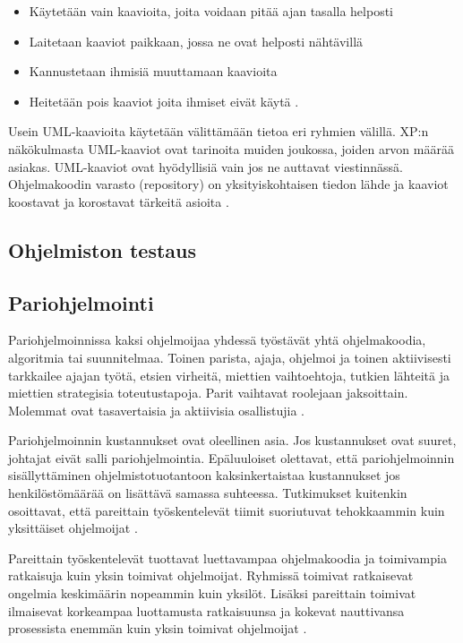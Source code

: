 \documentclass[finnish]{tktltiki2}
\theoremstyle{definition}
\theoremstyle{remark}
\begin{document}
\begin{itemize}
 \item Käytetään vain kaavioita, joita voidaan pitää ajan tasalla helposti 
 \item Laitetaan kaaviot paikkaan, jossa ne ovat helposti nähtävillä
 \item Kannustetaan ihmisiä muuttamaan kaavioita
 \item Heitetään pois kaaviot joita ihmiset eivät käytä \cite{FOW01b}.
\end{itemize}

Usein UML-kaavioita käytetään välittämään tietoa eri ryhmien välillä. XP:n näkökulmasta UML-kaaviot ovat tarinoita muiden joukossa, joiden arvon määrää asiakas. UML-kaaviot ovat hyödyllisiä vain jos ne auttavat viestinnässä. Ohjelmakoodin varasto (repository) on yksityiskohtaisen tiedon lähde ja kaaviot koostavat ja korostavat tärkeitä asioita \cite{FOW01b}.    


\subsection{Ohjelmiston testaus}


\subsection{Pariohjelmointi}

Pariohjelmoinnissa kaksi ohjelmoijaa yhdessä työstävät yhtä ohjelmakoodia, algoritmia tai suunnitelmaa. Toinen parista, ajaja, ohjelmoi ja toinen aktiivisesti tarkkailee ajajan työtä, etsien virheitä, miettien vaihtoehtoja, tutkien lähteitä ja miettien strategisia toteutustapoja. Parit vaihtavat roolejaan jaksoittain. Molemmat ovat tasavertaisia ja aktiivisia osallistujia \cite{WIL00}.

Pariohjelmoinnin kustannukset ovat oleellinen asia. Jos kustannukset ovat suuret, johtajat eivät salli pariohjelmointia. Epäluuloiset olettavat, että pariohjelmoinnin sisällyttäminen ohjelmistotuotantoon kaksinkertaistaa kustannukset jos henkilöstömäärää on lisättävä samassa suhteessa. Tutkimukset kuitenkin osoittavat, että pareittain työskentelevät tiimit suoriutuvat tehokkaammin kuin yksittäiset ohjelmoijat \cite{NOS98} \cite{WIL00}.

Pareittain työskentelevät tuottavat luettavampaa ohjelmakoodia ja toimivampia ratkaisuja kuin yksin toimivat ohjelmoijat. Ryhmissä toimivat ratkaisevat ongelmia keskimäärin nopeammin kuin yksilöt. Lisäksi pareittain toimivat ilmaisevat korkeampaa luottamusta ratkaisuunsa ja kokevat nauttivansa prosessista enemmän kuin yksin toimivat ohjelmoijat \cite{NOS98}.   
\end{document}
